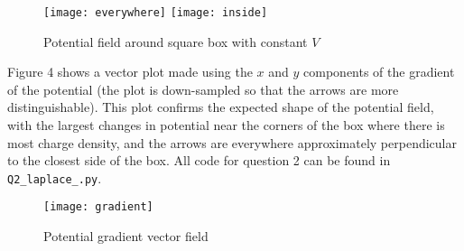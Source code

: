 \documentclass{article}
\newcommand{\<}[1]{\left\langle #1 \right\rangle }
\begin{document}
\begin{figure}[h]
	\caption{Potential field around square box with constant $V$}
	\centering
	\texttt{[image: everywhere]}
	\texttt{[image: inside]}
\end{figure}
Figure 4 shows a vector plot made using the $x$ and $y$ components of the gradient of the potential (the plot is down-sampled so that the arrows are more distinguishable). This plot confirms the expected shape of the potential field, with the largest changes in potential near the corners of the box where there is most charge density, and the arrows are everywhere approximately perpendicular to the closest side of the box. All code for question 2 can be found in \texttt{Q2\_laplace\_.py}.
\begin{figure}[h]
	\caption{Potential gradient vector field}
	\centering
	\texttt{[image: gradient]}
\end{figure}
	
\end{document}
